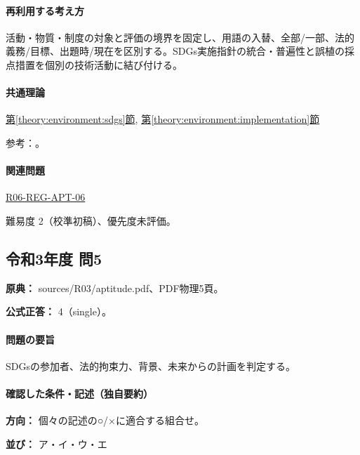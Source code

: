 \paragraph{再利用する考え方} 活動・物質・制度の対象と評価の境界を固定し、用語の入替、全部/一部、法的義務/目標、出題時/現在を区別する。SDGs実施指針の統合・普遍性と誤植の採点措置を個別の技術活動に結び付ける。

\paragraph{共通理論} \hyperref[theory:environment:sdgs]{第\ref*{theory:environment:sdgs}節}, \hyperref[theory:environment:implementation]{第\ref*{theory:environment:implementation}節}

\par 参考：\cite{env_sdgs2016}。

\paragraph{関連問題} \hyperref[q:r06-reg-apt-06]{R06-REG-APT-06}

\par 難易度 2（校準初稿）、優先度未評価。

\subsection{令和3年度 問5}
\label{q:r03-reg-apt-05}

\noindent\textbf{原典：} sources/R03/aptitude.pdf、PDF物理5頁。

\textbf{公式正答：} 4（single）。

\paragraph{問題の要旨} SDGsの参加者、法的拘束力、背景、未来からの計画を判定する。

\paragraph{確認した条件・記述（独自要約）}\mbox{}\par

\noindent\textbf{方向：} 個々の記述の○/×に適合する組合せ。\par

\noindent\textbf{並び：} ア・イ・ウ・エ\par

